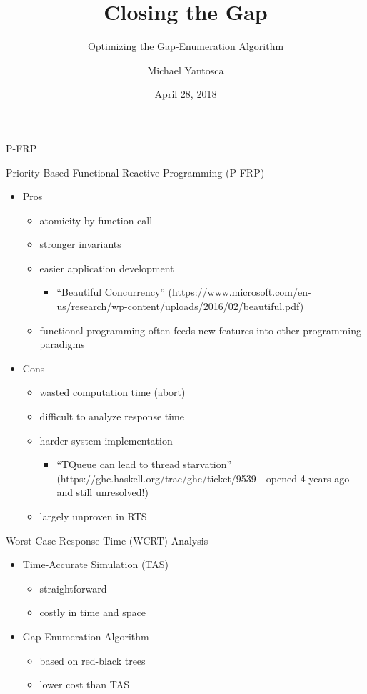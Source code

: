 \documentclass{beamer}
\author{Michael Yantosca}
\institute{University of Houston}
\date{April 28, 2018}
\title{Closing the Gap}
\subtitle{Optimizing the Gap-Enumeration Algorithm}
\begin{document}
\begin{frame}
  \titlepage
\end{frame}
\begin{section}{P-FRP}
\begin{frame}{Priority-Based Functional Reactive Programming (P-FRP)}
  \begin{itemize}
  \item{
    Pros
    \begin{itemize}
    \item{atomicity by function call}
    \item{stronger invariants}
    \item{
      easier application development
      \begin{itemize}
      \item{
        ``Beautiful Concurrency'' (https://www.microsoft.com/en-us/research/wp-content/uploads/2016/02/beautiful.pdf)
      }
      \end{itemize}
    }
    \item{functional programming often feeds new features into other programming paradigms}
    \end{itemize}
  }
  \item{
    Cons
    \begin{itemize}
    \item{wasted computation time (abort)}
    \item{difficult to analyze response time}
    \item{
      harder system implementation
      \begin{itemize}
        \item{``TQueue can lead to thread starvation'' (https://ghc.haskell.org/trac/ghc/ticket/9539 - opened 4 years ago and still unresolved!)}
      \end{itemize}
    }
    \item{largely unproven in RTS}
    \end{itemize}
  }
  \end{itemize}
\end{frame}
\begin{frame}{Worst-Case Response Time (WCRT) Analysis}
  \begin{itemize}
  \item{
    Time-Accurate Simulation (TAS)
    \begin{itemize}
    \item{straightforward}
    \item{costly in time and space}
    \end{itemize}
  }
  \item{
    Gap-Enumeration Algorithm
    \begin{itemize}
    \item{based on red-black trees\autocite[263-280]{CLR}}
    \item{lower cost than TAS\autocite[14-16]{BelwalCheng}}
    \end{itemize}
  }
  \end{itemize}
\end{frame}
\end{section}
\end{document}
